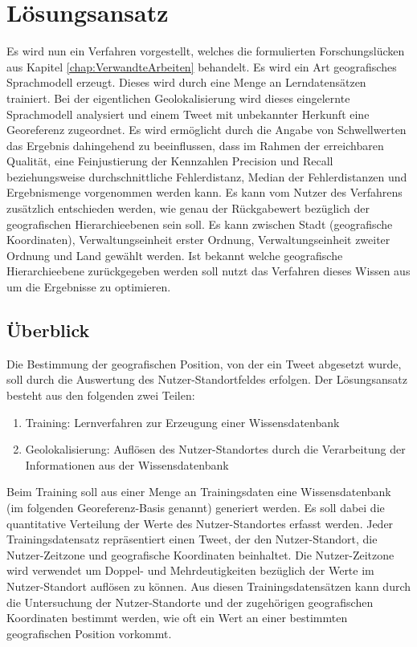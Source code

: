 \chapter{Lösungsansatz} \label{chp:Loesungsansatz}
		
	Es wird nun ein Verfahren vorgestellt, welches die formulierten Forschungslücken aus Kapitel \ref{chap:VerwandteArbeiten} behandelt.
	Es wird ein Art geografisches Sprachmodell erzeugt.
	Dieses wird durch eine Menge an Lerndatensätzen trainiert.
	Bei der eigentlichen Geolokalisierung wird dieses eingelernte Sprachmodell analysiert und einem Tweet mit unbekannter Herkunft eine Georeferenz zugeordnet.
	Es wird ermöglicht durch die Angabe von Schwellwerten das Ergebnis dahingehend zu beeinflussen, dass im Rahmen der erreichbaren Qualität, eine Feinjustierung der Kennzahlen Precision und Recall beziehungsweise durchschnittliche Fehlerdistanz, Median der Fehlerdistanzen und Ergebnismenge vorgenommen werden kann.
	Es kann vom Nutzer des Verfahrens zusätzlich entschieden werden, wie genau der Rückgabewert bezüglich der geografischen Hierarchieebenen sein soll.
	Es kann zwischen Stadt (geografische Koordinaten), Verwaltungseinheit erster Ordnung, Verwaltungseinheit zweiter Ordnung und Land gewählt werden.
	Ist bekannt welche geografische Hierarchieebene zurückgegeben werden soll nutzt das Verfahren dieses Wissen aus um die Ergebnisse zu optimieren.  


	\section{Überblick} 

		Die Bestimmung der geografischen Position, von der ein Tweet abgesetzt wurde, soll durch die Auswertung des Nutzer-Standortfeldes erfolgen. 
		Der Lösungsansatz besteht aus den folgenden zwei Teilen:

		\begin{enumerate}
			\item Training: Lernverfahren zur Erzeugung einer Wissensdatenbank 
			\item Geolokalisierung: Auflösen des Nutzer-Standortes durch die Verarbeitung der Informationen aus der Wissensdatenbank
		\end{enumerate}

		Beim Training soll aus einer Menge an Trainingsdaten eine Wissensdatenbank (im folgenden Georeferenz-Basis genannt) generiert werden.
		Es soll dabei die quantitative Verteilung der Werte des Nutzer-Standortes erfasst werden.
		Jeder Trainingsdatensatz repräsentiert einen Tweet, der den Nutzer-Standort, die Nutzer-Zeitzone und geografische Koordinaten beinhaltet.
		Die Nutzer-Zeitzone wird verwendet um Doppel- und Mehrdeutigkeiten bezüglich der Werte im Nutzer-Standort auflösen zu können. 
		Aus diesen Trainingsdatensätzen kann durch die Untersuchung der Nutzer-Standorte und der zugehörigen geografischen Koordinaten bestimmt werden, wie oft ein Wert an einer bestimmten geografischen Position vorkommt.

